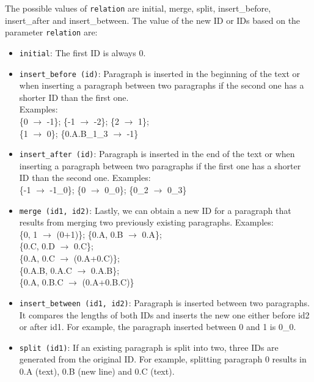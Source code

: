       The possible values of \texttt{relation} are {initial}, {merge}, {split}, {insert\_before}, {insert\_after} and {insert\_between}. The value of the new ID or IDs based on the parameter \texttt{relation} are:
      \begin{itemize}
        \item \texttt{initial}: The first ID is always 0.
        \item \texttt{insert\_before (id)}: Paragraph is inserted in the beginning of the text or when inserting a paragraph between two paragraphs if the second one has a shorter ID than the first one.\\
        Examples:\\
        \{0 $\rightarrow$ -1\}; 
        \{-1 $\rightarrow$ -2\}; 
        \{2 $\rightarrow$ 1\}; \\
        \{1 $\rightarrow$ 0\}; 
        \{0.A.B\_1\_3 $\rightarrow$ -1\}

        \item \texttt{insert\_after (id)}: Paragraph is inserted in the end of the text or when inserting a paragraph between two paragraphs if the first one has a shorter ID than the second one. Examples:\\
        \{-1 $\rightarrow$ -1\_0\};
        \{0 $\rightarrow$ 0\_0\};
        \{0\_2 $\rightarrow$ 0\_3\}
        \item \texttt{merge (id1, id2)}: Lastly, we can obtain a new ID for a paragraph that results from merging two previously existing paragraphs. Examples:\\
        \{0, 1 $\rightarrow$ (0+1)\};
        \{0.A, 0.B $\rightarrow$ 0.A\};\\
        \{0.C, 0.D $\rightarrow$ 0.C\};\\
        \{0.A, 0.C $\rightarrow$ (0.A+0.C)\};\\
        \{0.A.B, 0.A.C $\rightarrow$ 0.A.B\};\\
        \{0.A, 0.B.C $\rightarrow$ (0.A+0.B.C)\}
        \item \texttt{insert\_between (id1, id2)}: Paragraph is inserted between two paragraphs. It compares the lengths of both IDs and inserts the new one either before id2 or after id1. For example, the paragraph inserted between 0 and 1 is 0\_0.
        \item \texttt{split (id1)}: If an existing paragraph is split into two, three IDs are generated from the original ID. For example, splitting paragraph 0 results in\\0.A (text), 0.B (new line) and 0.C (text).
      \end{itemize}
    
